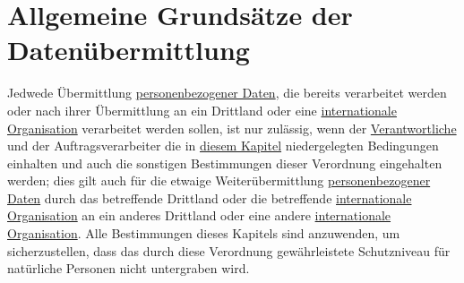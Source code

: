 \chapter{Allgemeine Grundsätze der Datenübermittlung}
\label{ch:44}


Jedwede Übermittlung \hyperref[itm:04-1]{personenbezogener Daten}, die bereits verarbeitet werden oder nach ihrer Übermittlung an ein
Drittland oder eine \hyperref[itm:04-29]{internationale Organisation} verarbeitet werden sollen, ist nur zulässig, wenn der \hyperref[itm:04-7]{Verantwortliche}
und der Auftragsverarbeiter die in \hyperref[part:5]{diesem Kapitel} niedergelegten Bedingungen einhalten und auch die
sonstigen Bestimmungen dieser Verordnung eingehalten werden; dies gilt auch für die etwaige Weiterübermittlung
\hyperref[itm:04-1]{personenbezogener Daten} durch das betreffende Drittland oder die betreffende \hyperref[itm:04-29]{internationale Organisation} an ein anderes
Drittland oder eine andere \hyperref[itm:04-29]{internationale Organisation}. Alle Bestimmungen dieses Kapitels sind anzuwenden, um
sicherzustellen, dass das durch diese Verordnung gewährleistete Schutzniveau für natürliche Personen nicht untergraben
wird.


